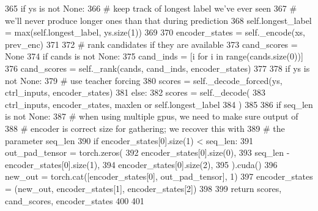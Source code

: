 \begin{DoxyCode}
365         \textcolor{keywordflow}{if} ys \textcolor{keywordflow}{is} \textcolor{keywordflow}{not} \textcolor{keywordtype}{None}:
366             \textcolor{comment}{# keep track of longest label we've ever seen}
367             \textcolor{comment}{# we'll never produce longer ones than that during prediction}
368             self.longest\_label = max(self.longest\_label, ys.size(1))
369 
370         encoder\_states = self.\_encode(xs, prev\_enc)
371 
372         \textcolor{comment}{# rank candidates if they are available}
373         cand\_scores = \textcolor{keywordtype}{None}
374         \textcolor{keywordflow}{if} cands \textcolor{keywordflow}{is} \textcolor{keywordflow}{not} \textcolor{keywordtype}{None}:
375             cand\_inds = [i \textcolor{keywordflow}{for} i \textcolor{keywordflow}{in} range(cands.size(0))]
376             cand\_scores = self.\_rank(cands, cand\_inds, encoder\_states)
377 
378         \textcolor{keywordflow}{if} ys \textcolor{keywordflow}{is} \textcolor{keywordflow}{not} \textcolor{keywordtype}{None}:
379             \textcolor{comment}{# use teacher forcing}
380             scores = self.\_decode\_forced(ys, ctrl\_inputs, encoder\_states)
381         \textcolor{keywordflow}{else}:
382             scores = self.\_decode(
383                 ctrl\_inputs, encoder\_states, maxlen \textcolor{keywordflow}{or} self.longest\_label
384             )
385 
386         \textcolor{keywordflow}{if} seq\_len \textcolor{keywordflow}{is} \textcolor{keywordflow}{not} \textcolor{keywordtype}{None}:
387             \textcolor{comment}{# when using multiple gpus, we need to make sure output of}
388             \textcolor{comment}{# encoder is correct size for gathering; we recover this with}
389             \textcolor{comment}{# the parameter seq\_len}
390             \textcolor{keywordflow}{if} encoder\_states[0].size(1) < seq\_len:
391                 out\_pad\_tensor = torch.zeros(
392                     encoder\_states[0].size(0),
393                     seq\_len - encoder\_states[0].size(1),
394                     encoder\_states[0].size(2),
395                 ).cuda()
396                 new\_out = torch.cat([encoder\_states[0], out\_pad\_tensor], 1)
397                 encoder\_states = (new\_out, encoder\_states[1], encoder\_states[2])
398 
399         \textcolor{keywordflow}{return} scores, cand\_scores, encoder\_states
400 
401 
\end{DoxyCode}


